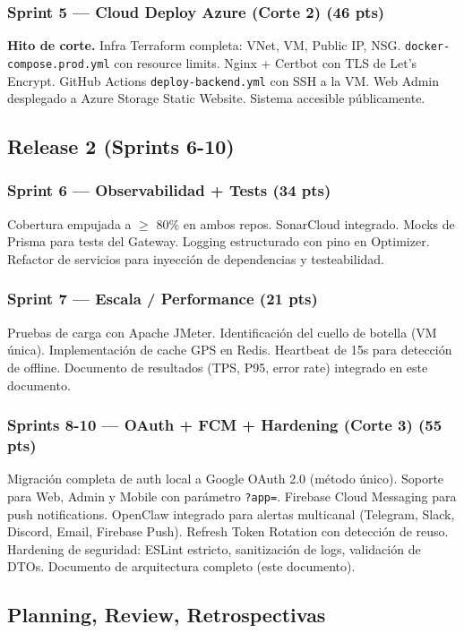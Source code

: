 \documentclass[12pt,a4paper,oneside]{article}
\begin{document}
\subsubsection*{Sprint 5 --- Cloud Deploy Azure (Corte 2) (46 pts)}
\textbf{Hito de corte.} Infra Terraform completa: VNet, VM, Public IP, NSG. \texttt{docker-compose.prod.yml} con resource limits. Nginx + Certbot con TLS de Let's Encrypt. GitHub Actions \texttt{deploy-backend.yml} con SSH a la VM. Web Admin desplegado a Azure Storage Static Website. Sistema accesible p\'ublicamente.

\subsection{Release 2 (Sprints 6-10)}

\subsubsection*{Sprint 6 --- Observabilidad + Tests (34 pts)}
Cobertura empujada a $\geq$ 80\% en ambos repos. SonarCloud integrado. Mocks de Prisma para tests del Gateway. Logging estructurado con pino en Optimizer. Refactor de servicios para inyecci\'on de dependencias y testeabilidad.

\subsubsection*{Sprint 7 --- Escala / Performance (21 pts)}
Pruebas de carga con Apache JMeter. Identificaci\'on del cuello de botella (VM \'unica). Implementaci\'on de cache GPS en Redis. Heartbeat de 15s para detecci\'on de offline. Documento de resultados (TPS, P95, error rate) integrado en este documento.

\subsubsection*{Sprints 8-10 --- OAuth + FCM + Hardening (Corte 3) (55 pts)}
Migraci\'on completa de auth local a Google OAuth 2.0 (m\'etodo \'unico). Soporte para Web, Admin y Mobile con par\'ametro \texttt{?app=}. Firebase Cloud Messaging para push notifications. OpenClaw integrado para alertas multicanal (Telegram, Slack, Discord, Email, Firebase Push). Refresh Token Rotation con detecci\'on de reuso. Hardening de seguridad: ESLint estricto, sanitizaci\'on de logs, validaci\'on de DTOs. Documento de arquitectura completo (este documento).

\subsection{Planning, Review, Retrospectivas}
\end{document}
